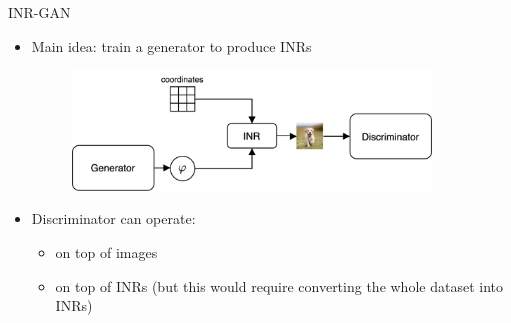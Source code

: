 \documentclass[10pt, handout]{beamer}
\begin{document}



\begin{frame}{INR-GAN}
\begin{itemize}
    \item\pause Main idea: train a generator to produce INRs
    \begin{figure}
        \centering
        \includegraphics[width=0.9\textwidth]{images/inr-gan}
    \end{figure}
    \item\pause Discriminator can operate:
    \begin{itemize}
        \item\pause on top of images
        \item\pause on top of INRs (but this would require converting the whole dataset into INRs)
    \end{itemize}
\end{itemize}
\end{frame}
\end{document}
